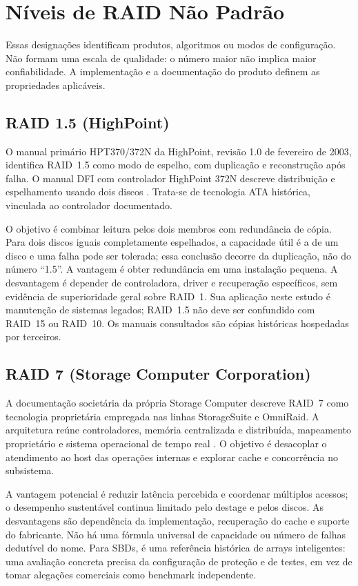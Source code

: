 \documentclass[titlepage]{article}
\begin{document}
\section{Níveis de RAID Não Padrão}
\label{sec:raid_nao_padrao}
Essas designações identificam produtos, algoritmos ou modos de configuração. Não formam uma escala de qualidade: o número maior não implica maior confiabilidade. A implementação e a documentação do produto definem as propriedades aplicáveis.

\subsection{RAID 1.5 (HighPoint)}
O manual primário HPT370/372N da HighPoint, revisão 1.0 de fevereiro de 2003, identifica RAID~1.5 como modo de espelho, com duplicação e reconstrução após falha. O manual DFI com controlador HighPoint 372N descreve distribuição e espelhamento usando dois discos \cite{highpoint_15,dfi_15}. Trata-se de tecnologia ATA histórica, vinculada ao controlador documentado.

O objetivo é combinar leitura pelos dois membros com redundância de cópia. Para dois discos iguais completamente espelhados, a capacidade útil é a de um disco e uma falha pode ser tolerada; essa conclusão decorre da duplicação, não do número ``1.5''. A vantagem é obter redundância em uma instalação pequena. A desvantagem é depender de controladora, driver e recuperação específicos, sem evidência de superioridade geral sobre RAID~1. Sua aplicação neste estudo é manutenção de sistemas legados; RAID~1.5 não deve ser confundido com RAID~15 ou RAID~10. Os manuais consultados são cópias históricas hospedadas por terceiros.

\subsection{RAID 7 (Storage Computer Corporation)}
A documentação societária da própria Storage Computer descreve RAID~7 como tecnologia proprietária empregada nas linhas StorageSuite e OmniRaid. A arquitetura reúne controladores, memória centralizada e distribuída, mapeamento proprietário e sistema operacional de tempo real \cite{storagecomputer_7}. O objetivo é desacoplar o atendimento ao host das operações internas e explorar cache e concorrência no subsistema.

A vantagem potencial é reduzir latência percebida e coordenar múltiplos acessos; o desempenho sustentável continua limitado pelo destage e pelos discos. As desvantagens são dependência da implementação, recuperação do cache e suporte do fabricante. Não há uma fórmula universal de capacidade ou número de falhas dedutível do nome. Para SBDs, é uma referência histórica de arrays inteligentes: uma avaliação concreta precisa da configuração de proteção e de testes, em vez de tomar alegações comerciais como benchmark independente.
\end{document}
